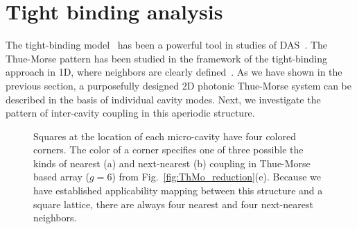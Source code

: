 \section{Tight binding analysis}
\label{sec:tb}

The tight-binding model~\cite{1954_Slater_tightBinding} has been a powerful tool in studies of DAS~\cite{2009_Barber}. The Thue-Morse pattern has been studied in the framework of the tight-binding approach in 1D, where neighbors are clearly defined~\cite{1995_Carpena}. As we have shown in the previous section, a purposefully designed 2D photonic Thue-Morse system can be described in the basis of individual cavity modes. Next, we investigate the pattern of inter-cavity coupling in this aperiodic structure.

\begin{figure}%
\caption[Squares at the location of each micro-cavity have four colored corners.]{\label{fig:coupling} Squares at the location of each micro-cavity have four colored corners. The color of a corner specifies one of three possible the kinds of nearest (a) and next-nearest (b) coupling in Thue-Morse based array ($g=6$) from Fig.~\ref{fig:ThMo_reduction}(e). Because we have established applicability mapping between this structure and a square lattice, there are always four nearest and four next-nearest neighbors. }
\end{figure}

